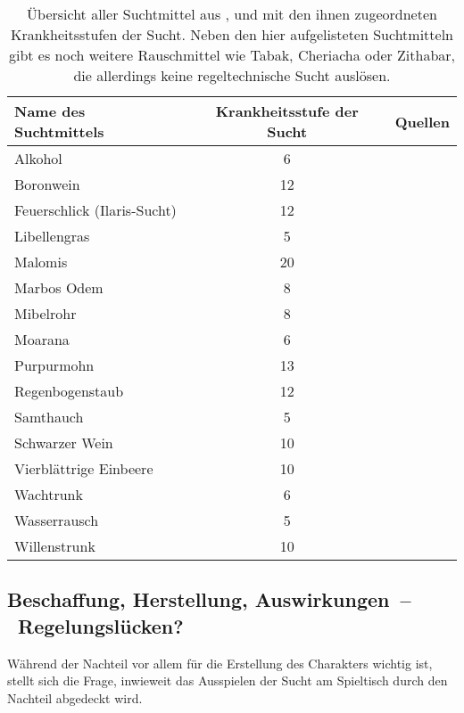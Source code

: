 \begin{table}
	\centering
	\caption[Suchtmittel aus ,  und ]{Übersicht aller Suchtmittel aus ,  und  mit den ihnen zugeordneten Krankheitsstufen der Sucht. Neben den hier aufgelisteten Suchtmitteln gibt es noch weitere Rauschmittel wie Tabak, Cheriacha oder Zithabar, die allerdings keine regeltechnische Sucht auslösen. \cite[S.~271]{WdH}\label{tbl-suchtmittel}}
	\begin{tabular}{lcr}
		\toprule
		{Name des Suchtmittels} & {Krankheitsstufe der Sucht} & {Quellen} \\
		\hline
		Alkohol & 6 & \cite[S.~271]{WdH} \\
		Boronwein & 12 & \cite[S.~271]{WdH}\cite[S.~272]{ZBA} \\
		Feuerschlick (Ilaris-Sucht) & 12 & \cite[S.~237]{ZBA} \\
		Libellengras & 5 & \cite[S.~194]{WdA} \\
		Malomis & 20 & \cite[S.~248]{ZBA} \\
		Marbos Odem & 8 & \cite[S.~271]{WdH}\cite[S.~247]{ZBA} \\
		Mibelrohr & 8 & \cite[S.~251]{ZBA} \\
		Moarana & 6 & \cite[S.~271]{WdH}\cite[S.~201]{ZBA} \\
		Purpurmohn & 13 & \cite[S.~253]{ZBA} \\
		Regenbogenstaub & 12 & \cite[S.~63]{WdA} \\
		Samthauch & 5 & \cite[S.~271]{WdH}\cite[S.~266]{ZBA} \\
		Schwarzer Wein & 10 & \cite[S.~271]{WdH} \\
		Vierblättrige Einbeere & 10 & \cite[S.~271]{ZBA} \\
		Wachtrunk & 6 & \cite[S.~64]{WdA} \\
		Wasserrausch & 5 & \cite[S.~273]{ZBA} \\
		Willenstrunk & 10 & \cite[S.~43/44]{WdA} \\
		\bottomrule
	\end{tabular}
\end{table}

\subsection{Beschaffung, Herstellung, Auswirkungen~--~Regelungslücken?}
Während der Nachteil vor allem für die Erstellung des Charakters wichtig ist, stellt sich die Frage, inwieweit das Ausspielen der Sucht am Spieltisch durch den Nachteil abgedeckt wird.

